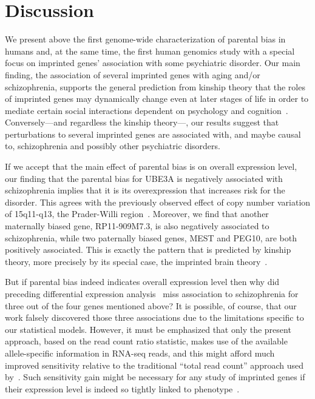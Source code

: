 \documentclass[letterpaper]{article}
\begin{document}
\section{Discussion}

We present above the first genome-wide characterization of parental
bias in humans and, at the same time, the first human genomics study with a
special focus on imprinted genes' association with some psychiatric
disorder.  Our main finding, the association of several imprinted genes with aging
and/or schizophrenia, supports the general prediction from kinship theory that the
roles of imprinted genes may dynamically change even at later stages of life
in order to mediate certain social interactions dependent on 
psychology and cognition~\cite{Ubeda2012,Wilkins2003}.  Conversely---and regardless
the kinship theory---, our results suggest that perturbations to several
imprinted genes are associated with, and maybe causal to, schizophrenia and
possibly other psychiatric disorders.

If we accept that the main effect of parental bias is on overall expression
level, our finding that the parental bias for UBE3A is negatively associated
with schizophrenia implies that it is its overexpression that increases risk
for the disorder.  This agrees with the previously observed effect of copy
number variation of 15q11-q13, the Prader-Willi region~\cite{McNamara2013}.
Moreover, we find that another maternally biased gene, RP11-909M7.3, is also
negatively associated to schizophrenia, while two paternally biased genes,
MEST and PEG10, are both positively associated.  This is exactly the pattern
that is predicted by kinship theory, more precisely by its special case, the
imprinted brain theory~\cite{Crespi2008a}.

But if parental bias indeed indicates overall expression level then why did
preceding differential expression analysis~\cite{Fromer2016a} miss association
to schizophrenia for three out of the four genes mentioned above?  It is
possible, of course, that our work falsely discovered those three associations
due to the limitations specific to our statistical models.
However, it must be emphasized that only the present approach, based on the read
count ratio statistic, makes use of the available allele-specific information in RNA-seq
reads, and this might afford much improved sensitivity relative to the
traditional ``total read count'' approach used by~\cite{Fromer2016a}.  Such
sensitivity gain might be necessary for any study of imprinted genes if their
expression level is indeed so tightly linked to phenotype~\cite{McNamara2013}.
\end{document}
